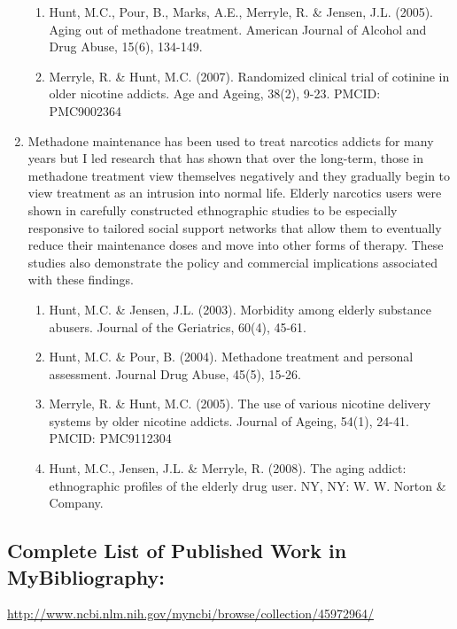 \documentclass{nihbiosketch}
\begin{document}
\begin{enumerate}
\begin{enumerate}
\item Hunt, M.C., Pour, B., Marks, A.E., Merryle, R. \& Jensen, J.L. (2005). Aging out of methadone treatment. American Journal of Alcohol and Drug Abuse, 15(6), 134-149. 

\item Merryle, R. \& Hunt, M.C. (2007). Randomized clinical trial of cotinine in older nicotine addicts. Age and Ageing, 38(2), 9-23. PMCID: PMC9002364
\end{enumerate}

\item Methadone maintenance has been used to treat narcotics addicts for many years but I led research that  has shown that over the long-term, those in methadone treatment view themselves negatively and they gradually begin to view treatment as an intrusion into normal life.   Elderly narcotics users were shown in carefully constructed ethnographic studies to be especially responsive to tailored social support networks that allow them to eventually reduce their maintenance doses and move into other forms of therapy.  These studies also demonstrate the policy and commercial implications associated with these findings.
\begin{enumerate}   
\item Hunt, M.C. \& Jensen, J.L. (2003). Morbidity among elderly substance abusers. Journal of the Geriatrics, 60(4), 45-61.

\item Hunt, M.C. \& Pour, B. (2004). Methadone treatment and personal assessment. Journal Drug Abuse, 45(5), 15-26. 

\item  Merryle, R. \& Hunt, M.C. (2005). The use of various nicotine delivery systems by older nicotine addicts. Journal of Ageing, 54(1), 24-41. PMCID: PMC9112304

\item Hunt, M.C., Jensen, J.L. \& Merryle, R. (2008). The aging addict: ethnographic profiles of the elderly drug user.  NY, NY: W. W. Norton \& Company.
\end{enumerate}

\end{enumerate}

\subsection*{Complete List of Published Work in MyBibliography:} 
\url{http://www.ncbi.nlm.nih.gov/myncbi/browse/collection/45972964/}
\end{document}
